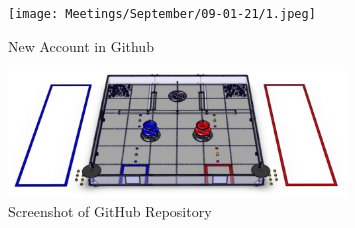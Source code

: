 \begin{figure}[ht]
\centering
\begin{minipage}[b]{.50\textwidth}
  \centering
  \texttt{[image: Meetings/September/09-01-21/1.jpeg]}
  \caption{New Account in Github}
  \label{fig:pic1}
\end{minipage}%
\hfill%
\begin{minipage}[b]{.50\textwidth}
  \centering
  \includegraphics[width=0.8\textwidth]{Meetings/September/09-18-21/field.png}
  \caption{Screenshot of GitHub Repository}
  \label{fig:pic2}
\end{minipage}
\end{figure}












